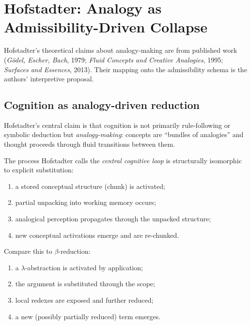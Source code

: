 \documentclass[12pt, a4paper]{article}
\theoremstyle{plain}
\theoremstyle{definition}
\theoremstyle{remark}
\begin{document}
\section{Hofstadter: Analogy as Admissibility-Driven Collapse}
\label{sec:hofstadter}

\begin{established}
  Hofstadter's theoretical claims about analogy-making are from
  published work (\textit{Gödel, Escher, Bach}, 1979;
  \textit{Fluid Concepts and Creative Analogies}, 1995;
  \textit{Surfaces and Essences}, 2013).
  Their mapping onto the admissibility schema is the authors'
  interpretive proposal.
\end{established}

\subsection{Cognition as analogy-driven reduction}

Hofstadter's central claim is that cognition is not primarily
rule-following or symbolic deduction but \emph{analogy-making}:
concepts are ``bundles of analogies'' and thought proceeds through
fluid transitions between them.

The process Hofstadter calls the \emph{central cognitive loop}
is structurally isomorphic to explicit substitution:
\begin{enumerate}
  \item a stored conceptual structure (chunk) is activated;
  \item partial unpacking into working memory occurs;
  \item analogical perception propagates through the unpacked structure;
  \item new conceptual activations emerge and are re-chunked.
\end{enumerate}

Compare this to $\beta$-reduction:
\begin{enumerate}
  \item a $\lambda$-abstraction is activated by application;
  \item the argument is substituted through the scope;
  \item local redexes are exposed and further reduced;
  \item a new (possibly partially reduced) term emerges.
\end{enumerate}
\end{document}
